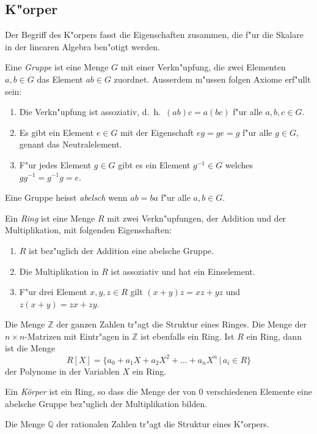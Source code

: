 %
%
\subsection{K"orper}
Der Begriff des K"orpers fasst die Eigenschaften zusammen, die f"ur
die Skalare in der linearen Algebra ben"otigt werden.

Eine {\em Gruppe} ist eine Menge $G$ mit einer Verkn"upfung, die zwei Elementen
$a,b\in G$ das Element $ab\in G$ zuordnet.
Ausserdem m"ussen folgen Axiome erf"ullt sein:
\begin{enumerate}[label={\bf G.\arabic*},itemsep=0mm]
\item
Die Verkn"upfung ist assoziativ, d.~h.~$(ab)c=a(bc)$ f"ur alle $a,b,c\in G$.
\item
Es gibt ein Element $e\in G$ mit der Eigenschaft $eg=ge=g$ f"ur alle $g\in G$,
genant das Neutralelement.
\item
F"ur jedes Element $g\in G$ gibt es ein Element $g^{-1}\in G$ welches
$gg^{-1}=g^{-1}g=e$.
\end{enumerate}
Eine Gruppe heisst {\em abelsch} wenn $ab=ba$ f"ur alle $a,b\in G$.

Ein {\em Ring} ist eine Menge $R$ mit zwei Verkn"upfungen, der Addition
und der Multiplikation, mit folgenden Eigenschaften:
\begin{enumerate}[label={\bf R.\arabic*},itemsep=0mm]
\item $R$ ist bez"uglich der Addition eine abelsche Gruppe.
\item Die Multiplikation in $R$ ist assoziativ und hat ein Einselement.
\item F"ur drei Element $x,y,z\in R$ gilt $(x+y)z=xz+yz$ und
$z(x+y)=zx+zy$.
\end{enumerate}

Die Menge $\mathbb Z$ der ganzen Zahlen tr"agt die Struktur eines Ringes.
Die Menge der $n\times n$-Matrizen mit Eintr"agen in $\mathbb Z$ ist ebenfalls
ein Ring.
Ist $R$ ein Ring, dann ist die Menge 
\[
R[X]=\{ a_0+a_1X +a_2X^2+\dots +a_nX^n\,|\,a_i\in R\}
\]
der Polynome in der Variablen $X$ ein Ring.

Ein {\em Körper} ist ein Ring, so dass die Menge der von $0$ verschiedenen
Elemente eine abelsche Gruppe bez"uglich der Multiplikation bilden.

Die Menge $\mathbb Q$ der rationalen Zahlen tr"agt die Struktur eines
K"orpers.

%
%
